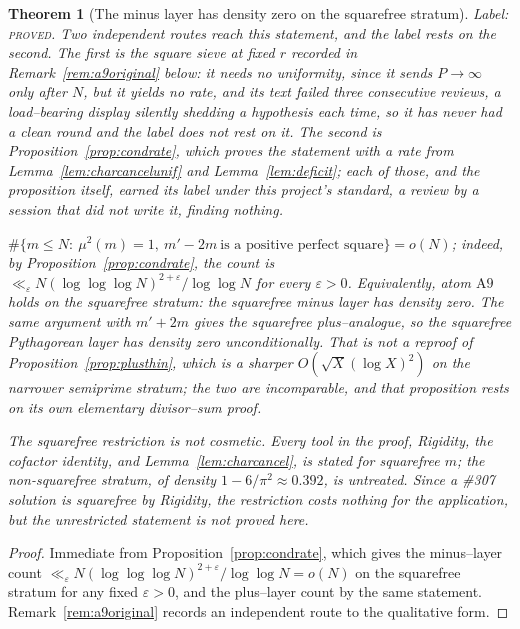 \documentclass[11pt]{article}
\newtheorem{theorem}{Theorem}[section]
\theoremstyle{definition}
\begin{document}
\begin{theorem}[The minus layer has density zero on the squarefree stratum]\label{thm:a9}
\textup{Label: \textsc{proved}. Two independent routes reach this statement, and the label rests on
the second. The first is the square sieve at fixed $r$ recorded in
Remark~\textup{\ref{rem:a9original}} below: it needs no uniformity, since it sends $P\to\infty$ only
after $N$, but it yields no rate, and its \emph{text} failed three consecutive reviews, a load--bearing display silently shedding
a hypothesis each time, so it has never had a clean round and the label does not rest on it. The
second is Proposition~\textup{\ref{prop:condrate}}, which proves the statement \emph{with a rate}
from Lemma~\textup{\ref{lem:charcancelunif}} and Lemma~\textup{\ref{lem:deficit}}; each of those, and
the proposition itself, earned its label under this project's standard, a review by a session that
did not write it, finding nothing.}

$\#\{m\le N:\ \mu^2(m)=1,\ m'-2m\ \text{is a positive perfect square}\}=o(N)$; indeed, by
Proposition~\ref{prop:condrate}, the count is
$\ll_\varepsilon N(\log\log\log N)^{2+\varepsilon}/\log\log N$ for every $\varepsilon>0$. Equivalently, atom
$\mathrm{A}9$ holds on the squarefree stratum: the squarefree minus layer has density zero. The same
argument with $m'+2m$ gives the squarefree plus--analogue, so the squarefree Pythagorean layer has
density zero unconditionally. That is \emph{not} a reproof of
Proposition~\textup{\ref{prop:plusthin}}, which is a sharper $O(\sqrt X(\log X)^2)$ on the narrower
semiprime stratum; the two are incomparable, and that proposition rests on its own elementary
divisor--sum proof.

The squarefree restriction is not cosmetic. Every tool
in the proof, Rigidity, the cofactor identity, and Lemma~\ref{lem:charcancel}, is stated for
squarefree $m$; the non-squarefree stratum, of density $1-6/\pi^2\approx0.392$, is untreated. Since
a \#307 solution is squarefree by Rigidity, the restriction costs nothing for the application, but
the unrestricted statement is not proved here.
\end{theorem}
\begin{proof}
Immediate from Proposition~\ref{prop:condrate}, which gives the minus--layer count
$\ll_\varepsilon N(\log\log\log N)^{2+\varepsilon}/\log\log N=o(N)$ on the squarefree stratum for
any fixed $\varepsilon>0$, and the plus--layer count by the same statement. Remark~\ref{rem:a9original}
records an independent route to the qualitative form.
\end{proof}
\end{document}
